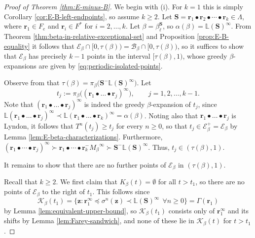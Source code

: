 \documentclass[11pt]{amsart}
\theoremstyle{definition}
\theoremstyle{remark}
\numberwithin{equation}{section}
\renewcommand{\L}{\ensuremath{\mathbb{L}}}
\newcommand{\BB}{\mathscr{B}}
\newcommand{\EE}{\mathscr{E}}
\newcommand{\cs}{ {\mathbf{S}}}
\renewcommand{\r}{ {\mathbf{r}}}
\newcommand{\z}{\mathbf{z}}
\newcommand{\Ga}{\Gamma}
\newcommand{\f}{\infty}
\newcommand{\al}{\alpha}
\newcommand{\lle}{\preccurlyeq}
\begin{document}
\begin{proof}[Proof of Theorem \ref{thm:E-minus-B}]
We begin with (i). For $k=1$ this is simply Corollary \ref{cor:E-B-left-endpoints}, so assume $k\geq 2$. Let $\cs=\r_1\bullet \r_2\bullet\cdots\bullet \r_k\in\Lambda$, where {$\r_1\in F_e$ and $\r_i\in F^*$ for $i=2,\dots,k$}. Let $\beta=\beta_\ell^\cs$, {so $\al(\beta)=\L(\cs)^\f$}. From Theorem \ref{thm:beta-in-relative-exceptional-set} and Proposition \ref{prop:E-B-equality} it follows that $\EE_\beta\cap[0,\tau(\beta))=\BB_\beta\cap[0,\tau(\beta))$, so it suffices to show that $\EE_\beta$ has precisely $k-1$ points in the interval $[\tau(\beta),1)$, whose greedy $\beta$-expansions are given by \eqref{eq:periodic-isolated-points}.

Observe from {\cite[Theorem 3.4]{Allaart-Kong-2024}} that
$\tau(\beta)=\pi_\beta\big(\cs^-\L(\cs)^\f\big)$.
Let
\[
t_j:=\pi_\beta\big((\r_1\bullet\dots\bullet\r_j)^\f\big), \qquad j=1,2,\dots,k-1.
\]
Note that $(\r_1\bullet\dots\bullet\r_j)^\f$ is indeed the greedy $\beta$-expansion of $t_j$, since
${\L(\r_1\bullet\dots\bullet\r_j)^\f}\prec {\L(\r_1\bullet\dots\bullet\r_k)^\f=}\al(\beta)$. Noting also that $\r_1\bullet\dots\bullet\r_j$ is Lyndon, it follows that $T^n(t_j)\geq t_j$ for every $n\geq 0$, so that $t_j\in\EE_\beta^+=\EE_\beta$ by Lemma \ref{lem:E-beta-characterizations}.
Furthermore, $(\r_1\bullet\cdots\bullet\r_j)^\f\succ \r_1\bullet\cdots\bullet\r_k^-{M_\beta}^\f\succ\cs^-\L(\cs)^\f$. Thus, $t_j\in(\tau(\beta), 1)$.

It remains to show that there are no further points of $\EE_\beta$ in $(\tau(\beta),1)$. %

Recall that $k\geq 2$. We first claim that $K_\beta(t)=\emptyset$ for all $t>t_1$, so there are no points of $\EE_\beta$ to the right of $t_1$. This follows since
\begin{equation*}
\mathcal{K}_\beta(t_1)=\{\z: \r_1^\f\lle \sigma^n(\z)\prec \L(\cs)^\f\ \ \forall n\geq 0\}=\Ga(\r_1)
\end{equation*}
by Lemma \ref{lem:equivalent-upper-bound}, so $\mathcal{K}_\beta(t_1)$ consists only of $\r_1^\f$ and its shifts by Lemma \ref{lem:Farey-sandwich}, and none of these lie in $\mathcal{K}_\beta(t)$ for $t>t_1$.


\end{proof}
\end{document}
